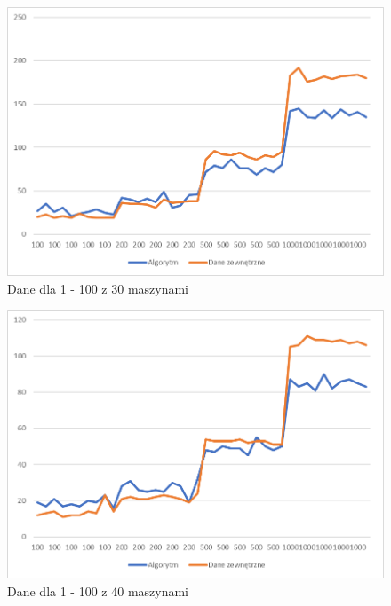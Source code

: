 \begin{figure}[h]
    \centering
    \includegraphics[scale=0.3]{1-100_30.png}
    \caption{Dane dla 1 - 100 z 30 maszynami}
    \label{1-100_30}
\end{figure}

\begin{figure}[h]
    \centering
    \includegraphics[scale=0.3]{1-100_40.png}
    \caption{Dane dla 1 - 100 z 40 maszynami}
    \label{1-100_40}
\end{figure}



